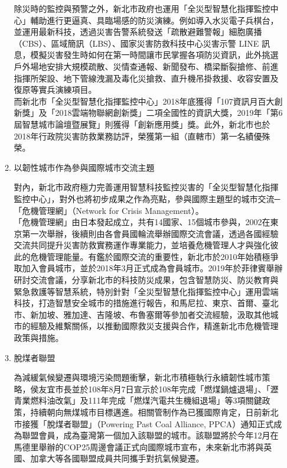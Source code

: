 \documentclass[a4paper,12pt]{article}
\begin{document}
\begin{enumerate}
\begin{enumerate}
除災時的監控與預警之外，新北市政府也運用「全災型智慧化指揮監控中心」輔助進行更逼真、具臨場感的防災演練。例如導入水災電子兵棋台，並運用最新科技，透過災害告警系統發送「疏散避難警報」細胞廣播（CBS）、區域簡訊（LBS）、國家災害防救科技中心災害示警 LINE 訊息，模擬災害發生時如何在第一時間讓市民掌握各項防災資訊，此外挑選戶外場地安排大規模疏散、災情查通報、新聞發布、橋梁斷裂搶修、前進指揮所架設、地下管線洩漏及毒化災搶救、直升機吊掛救援、收容安置及復原等實兵演練項目。\\

而新北市「全災型智慧化指揮監控中心」2018年底獲得「107資訊月百大創新獎」及「2018雲端物聯網創新獎」二項全國性的資訊大獎，2019年「第6屆智慧城市論壇暨展覽」則獲得「創新應用獎」獎。此外，新北市也於2018年行政院災害防救業務訪評，榮獲第一組（直轄市）第一名績優殊榮。\\
\item 以韌性城市作為參與國際城市交流主題
\label{sec:org4e3d4f8}

對內，新北市政府極力完善運用智慧科技監控災害的「全災型智慧化指揮監控中心」，對外也將初步成果之作為亮點，參與國際主題型的城市交流─「危機管理網」（Network for Crisis Management）。\\

「危機管理網」由日本發起成立，共有14國家、15個城市參與，2002在東京第一次舉辦，後續則由各會員國輪流舉辦國際交流會議，透過各國經驗交流共同提升災害防救實務運作專業能力，並培養危機管理人才與強化彼此的危機管理能量。有鑑於國際交流的重要性，新北市於2010年始積極爭取加入會員城市，並於2018年3月正式成為會員城市。2019年於菲律賓舉辦研討交流會議，分享新北市的科技防災成果，包含智慧防災、防災教育與緊急救護等智慧系統，特別針對「全災型智慧化指揮監控中心」運用雲端科技，打造智慧安全城市的措施進行報告，和馬尼拉、東京、首爾、臺北市、新加坡、雅加達、吉隆坡、布魯塞爾等參加者交流經驗，汲取其他城市的經驗及維繫關係，以推動國際救災支援與合作，精進新北市危機管理政策與措施。\\
\item 脫煤者聯盟
\label{sec:orgc7611c2}

為減緩氣候變遷與環境污染問題衝擊，新北市積極執行永續韌性城市策略，侯友宜市長並於108年8月7日宣示於108年完成「燃煤鍋爐退場」、「瀝青業燃料油改氣」及111年完成「燃煤汽電共生機組退場」等3項關鍵政策，持續朝向無煤城市目標邁進。相關管制作為已獲國際肯定，日前新北市接獲「脫煤者聯盟」（Powering Past Coal Alliance, PPCA）通知正式成為聯盟會員，成為臺灣第一個加入該聯盟的城市。該聯盟將於今年12月在馬德里舉辦的COP25周邊會議正式向國際城市宣布，未來新北市將與英國、加拿大等各國聯盟成員共同攜手對抗氣候變遷。\\


\end{enumerate}
\end{enumerate}
\end{document}
